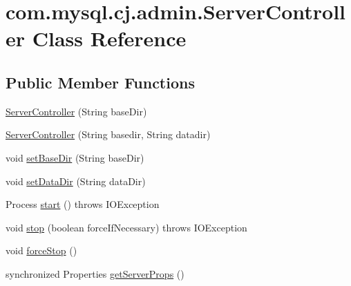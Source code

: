 \hypertarget{classcom_1_1mysql_1_1cj_1_1admin_1_1_server_controller}{}\section{com.\+mysql.\+cj.\+admin.\+Server\+Controller Class Reference}
\label{classcom_1_1mysql_1_1cj_1_1admin_1_1_server_controller}
\subsection*{Public Member Functions}
\begin{DoxyCompactItemize}
\item 
\mbox{\hyperlink{classcom_1_1mysql_1_1cj_1_1admin_1_1_server_controller_a4bfd555ef5a52f89d6edd72232d8f4d8}{Server\+Controller}} (String base\+Dir)
\item 
\mbox{\hyperlink{classcom_1_1mysql_1_1cj_1_1admin_1_1_server_controller_ab9a8133153b7cfe56d8071deb50dc307}{Server\+Controller}} (String basedir, String datadir)
\item 
void \mbox{\hyperlink{classcom_1_1mysql_1_1cj_1_1admin_1_1_server_controller_a966e07b0c4528fa8cae51975705dd8d2}{set\+Base\+Dir}} (String base\+Dir)
\item 
void \mbox{\hyperlink{classcom_1_1mysql_1_1cj_1_1admin_1_1_server_controller_a7289db6d097f54749cb6cd16e06c1607}{set\+Data\+Dir}} (String data\+Dir)
\item 
Process \mbox{\hyperlink{classcom_1_1mysql_1_1cj_1_1admin_1_1_server_controller_a6fa88d496021c33b2a334171749cd615}{start}} ()  throws I\+O\+Exception 
\item 
void \mbox{\hyperlink{classcom_1_1mysql_1_1cj_1_1admin_1_1_server_controller_a2b02c22e29bec215e59ec6d1f2995f48}{stop}} (boolean force\+If\+Necessary)  throws I\+O\+Exception 
\item 
void \mbox{\hyperlink{classcom_1_1mysql_1_1cj_1_1admin_1_1_server_controller_a02305d83af6ee295f85ac23768227a53}{force\+Stop}} ()
\item 
synchronized Properties \mbox{\hyperlink{classcom_1_1mysql_1_1cj_1_1admin_1_1_server_controller_a382fcf708f4a1ce600dbd5d387fe4751}{get\+Server\+Props}} ()
\end{DoxyCompactItemize}
